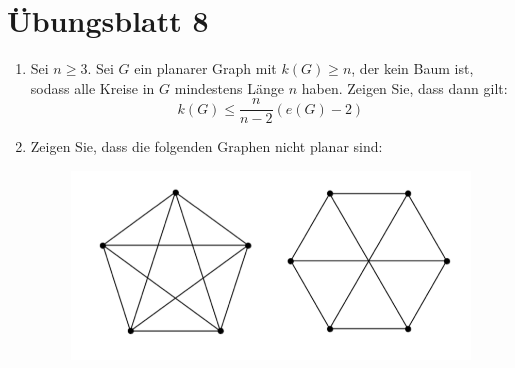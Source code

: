 %
\section{Übungsblatt 8}
\setcounter{problemcounter}{0}

\begin{assignment}
  \begin{enumerate}[label= (\alph*)] 
    \item Sei \( n \geq 3 \). Sei \( G \) ein planarer Graph mit \( k(G) \geq n \), der kein Baum ist, sodass alle Kreise in \( G \) mindestens Länge \( n \) haben. Zeigen Sie, dass dann gilt:
    \begin{equation*}
      k(G) \leq \frac{n}{n-2}(e(G) - 2)
    \end{equation*}
    \item Zeigen Sie, dass die folgenden Graphen nicht planar sind: 
    \begin{figure}[H]
      \centering
      \includegraphics[width=.5\textwidth]{assets/images/Abb1-15-12-assignment.png}
    \end{figure}
  \end{enumerate} 
\end{assignment}
